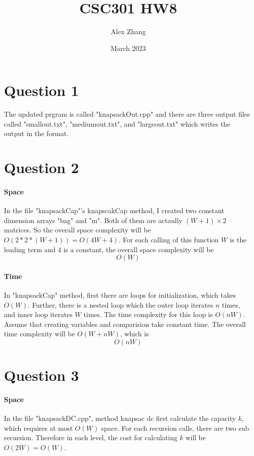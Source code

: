 \documentclass{article}
\title{CSC301 HW8}
\author{Alex Zhang}
\date{March 2023}
\begin{document}
\maketitle
\section*{Question 1}
The updated prgram is called "knapsackOut.cpp" and there are three output files called 
"smallout.txt", "mediumout.txt", and "largeout.txt" which writes the output in the format.

\section*{Question 2}
\paragraph{Space}

In the file "knapsackCap"'s knapscakCap method, I created two constant dimension arrays "bag"
and "m". Both of them are actaully $(W+1) \times 2$ matrices. So the overall space complexity will
be $O(2*2*(W+1)) = O(4W + 4)$. For each calling of this function $W$ is the leading term and $4$ is a constant, the overall
space complexity will be
$$O(W)$$

\paragraph{Time}

In "knapsackCap" method, first there are loops for initialization, which takes $O(W)$. Further,
there is a nested loop which the outer loop iterates $n$ times, and inner loop iterates $W$ times.
The time complexity for this loop is $O(nW)$. Assume that creating variables and comparision take constant
time. The overall time complexity will be $O(W + nW)$, which is 
$$O(nW)$$


\section*{Question 3}
\paragraph{Space}
In the file "knapsackDC.cpp", method knapsac dc first calculate the capacity $k$,
which requires at most $O(W)$ space. For each recursion calls, there are two sub recursion.
Therefore in each level, the cost for calculating $k$ will be $O(2W) = O(W)$.
\end{document}
